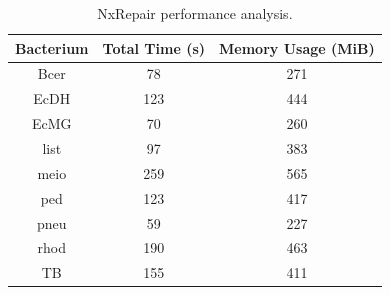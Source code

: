 \documentclass[fleqn,10pt]{wlpeerj}
\begin{document}
\begin{table}
\begin{center}
\begin{tabular}{|c|c|c|}
    \hline
    Bacterium & Total Time (s) & Memory Usage (MiB) \\ \hline
    Bcer & 78 & 271 \\
    EcDH & 123 & 444 \\
    EcMG & 70 & 260 \\
    list & 97 & 383 \\
    meio & 259 & 565 \\
    ped & 123 & 417 \\
    pneu & 59 & 227 \\
    rhod & 190 & 463 \\
    TB & 155 & 411 \\ 
    \hline
\end{tabular}
\end{center}
\caption{NxRepair performance analysis. \label{tab:performance}}
\end{table}
\end{document}
